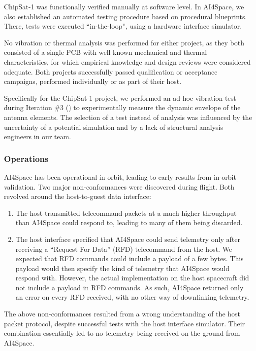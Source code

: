 \documentclass[journal,10pt]{IEEEtran}
\begin{document}
ChipSat-1 was functionally verified manually at software level. In AI4Space, we also established an automated testing procedure based on procedural blueprints. There, tests were executed ``in-the-loop'', using a hardware interface simulator.

No vibration or thermal analysis was performed for either project, as they both consisted of a single PCB with well known mechanical and thermal characteristics, for which empirical knowledge and design reviews were considered adequate.
Both projects successfully passed qualification or acceptance campaigns, performed individually or as part of their host.

Specifically for the ChipSat-1 project, we performed an ad-hoc vibration test during Iteration \#3 (\mbox{}) to experimentally measure the dynamic envelope of the antenna elements. The selection of a test instead of analysis was influenced by the uncertainty of a potential simulation and by a lack of structural analysis engineers in our team.

\subsubsection{Operations}

AI4Space has been operational in orbit, leading to early results from in-orbit validation. Two major non-conformances were discovered during flight. Both revolved around the host-to-guest data interface:
\begin{enumerate}
	\item The host transmitted telecommand packets at a much higher throughput than AI4Space could respond to, leading to many of them being discarded.
	\item The host interface specified that AI4Space could send telemetry only after receiving a ``Request For Data'' (\acs{RFD}) telecommand from the host. We expected that \acs{RFD} commands could include a payload of a few bytes. This payload would then specify the kind of telemetry that AI4Space would respond with. However, the actual implementation on the host spacecraft did not include a payload in RFD commands. As such, AI4Space returned only an error on every \acs{RFD} received, with no other way of downlinking telemetry.
\end{enumerate} 

The above non-conformances resulted from a wrong understanding of the host packet protocol, despite successful tests with the host interface simulator. Their combination essentially led to no telemetry being received on the ground from AI4Space.
\end{document}
